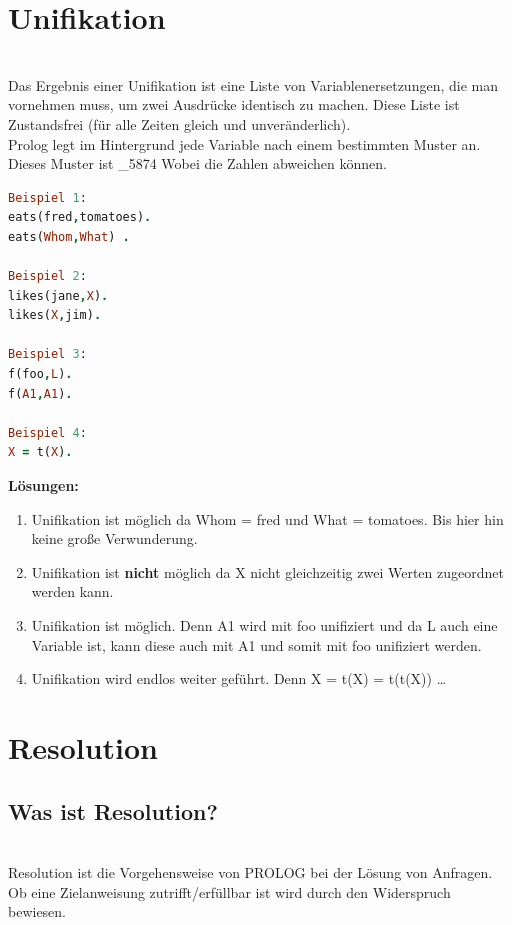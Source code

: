 \section{Unifikation}\label{sec:unifikation}\qquad\\
Das Ergebnis einer Unifikation ist eine Liste von Variablenersetzungen, die man vornehmen muss, um zwei Ausdrücke identisch zu machen. Diese Liste ist Zustandsfrei (für alle Zeiten gleich und unveränderlich).\\ Prolog legt im Hintergrund jede Variable nach einem bestimmten Muster an. Dieses Muster ist \_5874 Wobei die Zahlen abweichen können. 
\begin{lstlisting}[language=Prolog] 
Beispiel 1:
eats(fred,tomatoes).
eats(Whom,What) .

Beispiel 2:
likes(jane,X).
likes(X,jim).

Beispiel 3:
f(foo,L).
f(A1,A1).

Beispiel 4:
X = t(X).
\end{lstlisting}
\textbf{Lösungen:}\qquad\\
\begin{enumerate}
	\item Unifikation ist möglich da Whom = fred und What = tomatoes. Bis hier hin keine große Verwunderung.
	\item Unifikation ist \textbf{nicht} möglich da X nicht gleichzeitig zwei Werten zugeordnet werden kann.
	\item Unifikation ist möglich. Denn A1 wird mit foo unifiziert und da L auch eine Variable ist, kann diese auch mit A1 und somit mit foo unifiziert werden. 
	\item Unifikation wird endlos weiter geführt. Denn X = t(X) = t(t(X)) \dots
\end{enumerate}
\section{Resolution}
\subsection{Was ist Resolution?}\qquad\\
Resolution ist die Vorgehensweise von PROLOG bei der Lösung von Anfragen.\\
Ob eine Zielanweisung zutrifft/erfüllbar ist wird durch den Widerspruch bewiesen. 
